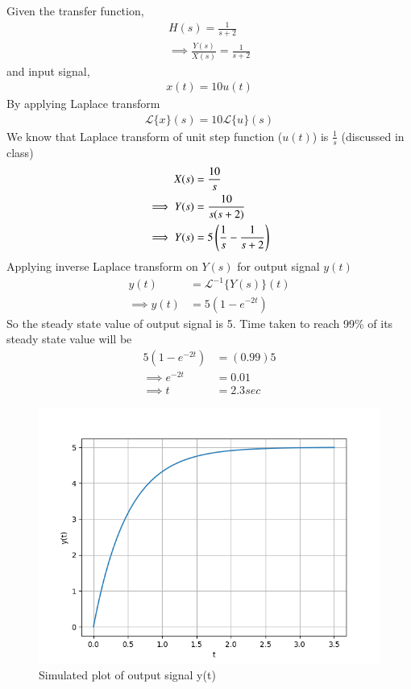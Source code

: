 Given the transfer function, \begin{align}
    H(s) = \frac{1}{s+2}\\
    \implies \frac{Y(s)}{X(s)} = \frac{1}{s+2}
\end{align}
and input signal,
\begin{align}
    x(t) = 10u(t)
\end{align}
By applying Laplace transform
\begin{align}
    \mathcal{L}\{x\}(s)=10\mathcal{L}\{u\}(s)
\end{align}
We know that Laplace transform of unit step function ($u(t)$) is $\frac{1}{s}$ (discussed in class) 
\begin{align}
    X(s) &= \frac{10}{s}\\
    \implies Y(s) &= \frac{10}{s(s+2)}\\
    \implies Y(s) &= 5\left(\frac{1}{s}-\frac{1}{s+2}\right)
\end{align}
Applying inverse Laplace transform on $Y(s)$ for output signal $y(t)$
\begin{align}
    y(t) &= \mathcal{L}^{-1}\{Y(s)\}(t)\\
    \implies y(t) &= 5(1-e^{-2t})
\end{align}
So the steady state value of output signal is 5. Time taken to reach 99\% of its steady state value will be
\begin{align}
    5(1-e^{-2t}) &= (0.99)5\\
    \implies e^{-2t} &= 0.01\\
    \implies t &= 2.3sec
\end{align}
\begin{figure}[!ht]
    \centering
    \includegraphics[width=\columnwidth]{solutions/ec/2004/64/figures/simulated_plot.png}
    \caption{Simulated plot of output signal y(t)}
    \label{ec/2004/64/plot}
\end{figure}
